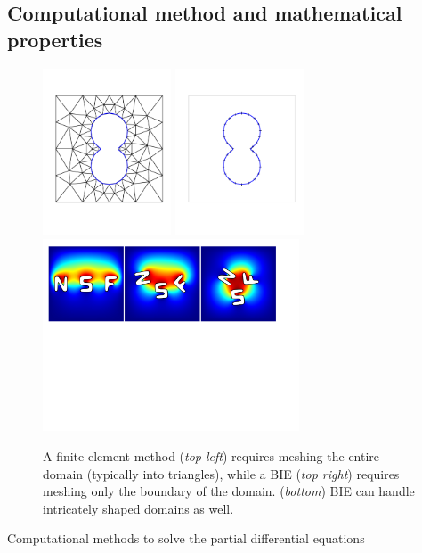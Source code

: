 \subsection{Computational method and mathematical properties}
\begin{figure}
  \vspace{-8pt}
  \centering
  \includegraphics[width=1.5in]{figures/Background/Peanut/PeanutFEM.pdf}
  \includegraphics[width=1.5in]{figures/Background/Peanut/PeanutIE.pdf}\\
  \includegraphics[width=3in]{figures/Background/NSF.pdf}\\
\caption{\label{fig:fem_vs_bie} \footnotesize A finite element method
  ({\em top left}) requires meshing the entire domain (typically into
  triangles), while a BIE ({\em top right}) requires meshing only the
  boundary of the domain.
  ({\em bottom}) BIE can handle intricately shaped domains as well.}
\end{figure}
Computational methods to solve the partial differential equations
